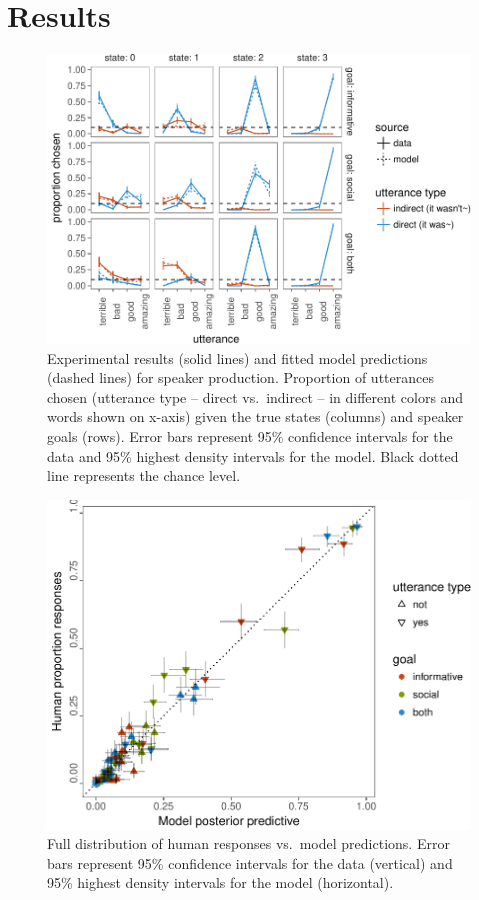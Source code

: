 \documentclass[12pt]{article}
\begin{document}
\hypertarget{results}{%
\section{Results}\label{results}}

\begin{figure}
\centering
\includegraphics{politeness_files/figure-latex/utterancePrediction-1.pdf}
\caption{\label{fig:utterancePrediction}Experimental results (solid lines)
and fitted model predictions (dashed lines) for speaker production.
Proportion of utterances chosen (utterance type -- direct vs.~indirect
-- in different colors and words shown on x-axis) given the true states
(columns) and speaker goals (rows). Error bars represent 95\% confidence
intervals for the data and 95\% highest density intervals for the model.
Black dotted line represents the chance level.}
\end{figure}

\begin{figure}
\centering
\includegraphics{politeness_files/figure-latex/varianceExplained-1.pdf}
\caption{\label{fig:varianceExplained}Full distribution of human responses
vs.~model predictions. Error bars represent 95\% confidence intervals
for the data (vertical) and 95\% highest density intervals for the model
(horizontal).}
\end{figure}
\end{document}

